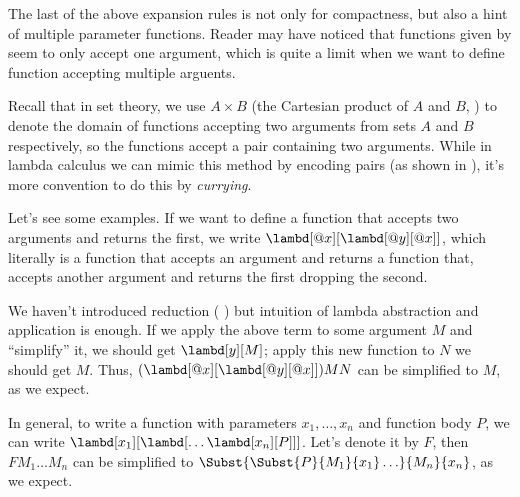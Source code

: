 \documentclass[../../../include/open-logic-section]{subfiles}
\begin{document}

The last of the above expansion rules is not only for compactness, but
also a hint of multiple parameter functions. Reader may have noticed
that functions given by  seem to only accept one argument, which
is quite a limit when we want to define function accepting multiple
arguents.

Recall that in set theory, we use $A \times B$ (the Cartesian product
of $A$ and $B$, \olref[sfr][set][pai]) to denote the domain of functions accepting two
arguments from sets $A$ and $B$ respectively, so the functions accept
a pair containing two arguments. While in lambda calculus we can mimic
this method by encoding pairs (as shown in ), it's
more convention to do this by \emph{currying}.

Let's see some examples. If we want to define a function that accepts
two arguments and returns the first, we write
$\lambd[@x][\lambd[@y][@x]]$, which literally is a function that accepts
an argument and returns a function that, accepts another argument and
returns the first dropping the second. 

We haven't introduced reduction ( ) but intuition
of lambda abstraction and application is enough. If we apply the above
term to some argument $M$ and ``simplify'' it, we should get $\lambd[y][M]$; apply this new function to $N$
we should get $M$. Thus, $(\lambd[@x][\lambd[@y][@x]])MN$ can be
simplified to $M$, as we expect.

In general, to write a function with parameters $x_1, \ldots, x_n$
and function body $P$, we can write
$\lambd[x_1][\lambd[\ldots\lambd[x_n][P]]]$. Let's denote it by $F$,
then $FM_1\ldots M_n$ can be simplified to
$\Subst{\Subst{P}{M_1}{x_1}\ldots}{M_n}{x_n}$, as we expect.
\end{document}
